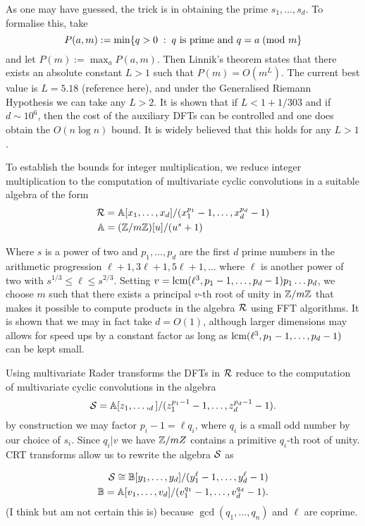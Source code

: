 As one may have guessed, the trick is in obtaining the prime $s_1, \ldots, s_d$. To formalise this, take
\[
    P(a, m) := \min\{q > 0\;:\; q \textrm{ is prime and } q = a \;(\textrm{mod } m\}
\]
and let $P(m) := \max_a P(a, m)$. Then Linnik's theorem states that there exists an absolute constant $L > 1$ such that $P(m) = O(m^L)$. The current best value is $L = 5.18$ (reference here), and under the Generalised Riemann Hypothesis we can take any $L > 2$. It is shown \cite{ffnlogn} that if $L < 1 + 1/303$ and if $d \sim 10^6$, then the cost of the auxiliary DFTs can be controlled and one does obtain the $O(n \log n)$ bound. It is widely believed that this holds for any $L > 1$.

To establish the bounds for integer multiplication, we reduce integer multiplication to the computation of multivariate cyclic convolutions in a suitable algebra of the form
\begin{align*}
    \mathcal R &= \mathbb{A}[x_1, \ldots, x_d] / (x_1^{p_1} - 1, \ldots, x_d^{p_d} - 1)\\
    \mathbb{A} &= ({\mathbb Z} / m{\mathbb Z})[u] / (u^s + 1)
\end{align*}

Where $s$ is a power of two and $p_1, \ldots, p_d$ are the first $d$ prime numbers in the arithmetic progression $\ell + 1, 3\ell + 1, 5\ell + 1, \ldots$ where $\ell$ is another power of two with $s^{1/3} \leq \ell \leq s^{2/3}$.  Setting $v = \textrm{lcm}(\ell^3, p_1 - 1, \ldots, p_d - 1)p_1\dots p_d$, we choose $m$ such that there exists a principal $v$-th root of unity in ${\mathbb Z}/m{\mathbb Z}$ that makes it possible to compute products in the algebra $\mathcal R$ using FFT algorithms. It is shown that we may in fact take $d = O(1)$, although larger dimensions may allows for speed ups by a constant factor as long as $\textrm{lcm}(\ell^3, p_1 - 1, \ldots, p_d - 1)$ can be kept small.

Using multivariate Rader transforms the DFTs in $\mathcal R$ reduce to the computation of multivariate cyclic convolutions in the algebra
\[
    \mathcal S = {\mathbb A}[z_1, \ldots, _d] / (z_1^{p_1 - 1} - 1, \ldots, z_d^{p_d - 1} - 1).
\]
by construction we may factor $p_i - 1 = \ell q_i$, where $q_i$ is a small odd number by our choice of $s_i$. Since $q_i | v$ we have ${\mathbb Z} /mZ$ contains a primitive $q_i$-th root of unity. CRT transforms allow us to rewrite the algebra $\mathcal S$ as

\begin{align*}
    \mathcal S \cong \mathbb{B}[y_1, \ldots, y_d]/(y_1^\ell - 1, \ldots, y_d^\ell - 1)\\
    \mathbb{B} = \mathbb{A}[v_1, \ldots, v_d] / (v_1^{q_1} - 1, \ldots, v_d^{q_d} - 1).
\end{align*}
(I think but am not certain this is) because $\gcd(q_1, \ldots, q_n)$ and $\ell$ are coprime.

